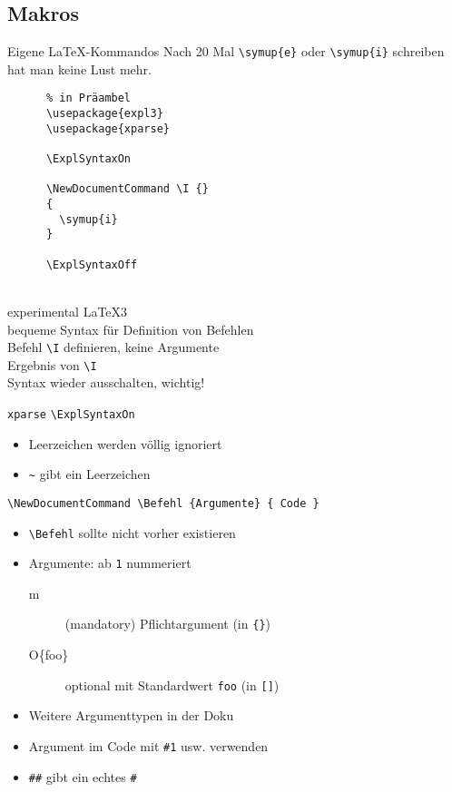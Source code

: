 \subsection{Makros}

\begin{frame}[fragile]{Eigene \LaTeX-Kommandos}
  Nach 20 Mal \lstinline+\symup{e}+ oder \lstinline+\symup{i}+ schreiben hat man keine Lust mehr.

  \vspace{2em}
  \begin{CodeExplanation}{0.45}
    \begin{lstlisting}
      % in Präambel
      \usepackage{expl3}
      \usepackage{xparse}

      \ExplSyntaxOn

      \NewDocumentCommand \I {}
      {
        \symup{i}
      }

      \ExplSyntaxOff
    \end{lstlisting}
  \Explanation
    \strut \\
    experimental \LaTeX3 \\[2\baselineskip]
    bequeme Syntax für Definition von Befehlen \\[\baselineskip]
    Befehl \lstinline+\I+ definieren, keine Argumente \\[\baselineskip]
    Ergebnis von \lstinline+\I+ \\[2\baselineskip]
    Syntax wieder ausschalten, wichtig!
  \end{CodeExplanation}
\end{frame}

\begin{frame}[fragile]{
  \texttt{xparse}
  \hfill
}
  \lstinline+\ExplSyntaxOn+
  \begin{itemize}
    \item Leerzeichen werden völlig ignoriert
    \item \lstinline+~+ gibt ein Leerzeichen
  \end{itemize}

  \lstinline+\NewDocumentCommand \Befehl {Argumente} { Code }+
  \begin{itemize}
    \item \lstinline+\Befehl+ sollte nicht vorher existieren
    \item Argumente: ab \texttt{1} nummeriert
      \begin{description}
        \item[m] (mandatory) Pflichtargument (in \lstinline+{}+)
        \item[O\{foo\}] optional mit Standardwert \texttt{foo} (in \lstinline+[]+)
      \end{description}
    \item Weitere Argumenttypen in der Doku
    \item Argument im Code mit \lstinline+#1+ usw. verwenden
    \item \lstinline+##+ gibt ein echtes \lstinline+#+
  \end{itemize}
\end{frame}

